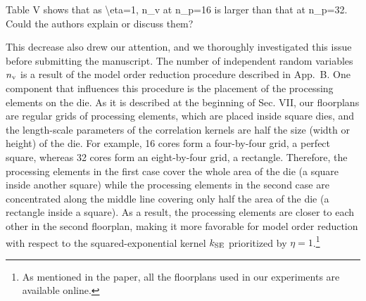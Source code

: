 \begin{reviewer}
Table V shows that as \textbackslash{}eta=1, n\_v at n\_p=16 is larger than that at n\_p=32. Could the authors explain or discuss them?
\end{reviewer}
\begin{authors}
This decrease also drew our attention, and we thoroughly investigated this issue before submitting the manuscript.
The number of independent random variables ${n_\text{v}}$ is a result of the model order reduction procedure described in App.~B.
One component that influences this procedure is the placement of the processing elements on the die.
As it is described at the beginning of Sec. VII, our floorplans are regular grids of processing elements, which are placed inside square dies, and the length-scale parameters of the correlation kernels are half the size (width or height) of the die.
For example, 16 cores form a four-by-four grid, a perfect square, whereas 32 cores form an eight-by-four grid, a rectangle.
Therefore, the processing elements in the first case cover the whole area of the die (a square inside another square) while the processing elements in the second case are concentrated along the middle line covering only half the area of the die (a rectangle inside a square).
As a result, the processing elements are closer to each other in the second floorplan, making it more favorable for model order reduction with respect to the squared-exponential kernel $\fCorr_\SE$ prioritized by $\eta = 1$.\footnote{As mentioned in the paper, all the floorplans used in our experiments are available online.}

\begin{actions}
\end{actions}
\end{authors}

